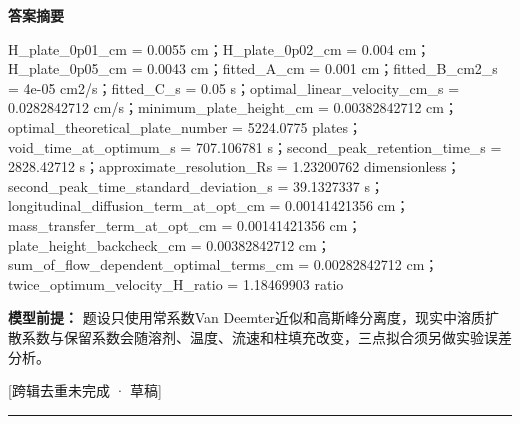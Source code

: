 \documentclass[UTF8,11pt,a4paper]{ctexart}
\begin{document}
\noindent\textbf{答案摘要}\par
H\_plate\_0p01\_cm = 0.0055 cm；H\_plate\_0p02\_cm = 0.004 cm；H\_plate\_0p05\_cm = 0.0043 cm；fitted\_A\_cm = 0.001 cm；fitted\_B\_cm2\_s = 4e-05 cm2/s；fitted\_C\_s = 0.05 s；optimal\_linear\_velocity\_cm\_s = 0.0282842712 cm/s；minimum\_plate\_height\_cm = 0.00382842712 cm；optimal\_theoretical\_plate\_number = 5224.0775 plates；void\_time\_at\_optimum\_s = 707.106781 s；second\_peak\_retention\_time\_s = 2828.42712 s；approximate\_resolution\_Rs = 1.23200762 dimensionless；second\_peak\_time\_standard\_deviation\_s = 39.1327337 s；longitudinal\_diffusion\_term\_at\_opt\_cm = 0.00141421356 cm；mass\_transfer\_term\_at\_opt\_cm = 0.00141421356 cm；plate\_height\_backcheck\_cm = 0.00382842712 cm；sum\_of\_flow\_dependent\_optimal\_terms\_cm = 0.00282842712 cm；twice\_optimum\_velocity\_H\_ratio = 1.18469903 ratio\par
\noindent\textbf{模型前提：}
题设只使用常系数Van Deemter近似和高斯峰分离度，现实中溶质扩散系数与保留系数会随溶剂、温度、流速和柱填充改变，三点拟合须另做实验误差分析。\par
\noindent\textcolor{red!65!black}{[跨辑去重未完成 · 草稿]} \par
\medskip\hrule\medskip
{}
\end{document}
